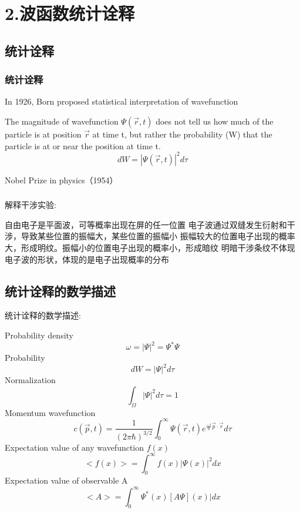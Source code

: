 \begin{frame}
\begin{columns}
\begin{column}[t]{0.46\linewidth}
\begin{center}
                \end{center} 
            \end{column}
        \end{columns}
\end{frame}

\section{2.波函数统计诠释}

\subsection{统计诠释}
\begin{frame}
    \frametitle{统计诠释}
    In 1926, Born proposed statistical interpretation of wavefunction
    \begin{tcolorbox4}
        \large The magnitude of wavefunction $\Psi(\vec{r},t)$ does not tell us how much of 
        the particle is at position $\vec{r}$ at time t, 
        but rather the probability (W) that the particle is at or near the position at time t. \\
        \[ d W = |\Psi(\vec{r},t)|^2 d \tau \]
    \end{tcolorbox4}
    {\color{deepred} Nobel Prize in physics（1954）}
\end{frame}

\begin{frame}
    \frametitle{}
    解释干涉实验:
    \begin{itemize}
        \Item 自由电子是平面波，可等概率出现在屏的任一位置
        \Item 电子波通过双缝发生衍射和干涉，导致某些位置的振幅大，某些位置的振幅小
        \Item 振幅较大的位置电子出现的概率大，形成明纹。振幅小的位置电子出现的概率小，形成暗纹
        \Item 明暗干涉条纹不体现电子波的形状，体现的是电子出现概率的分布
    \end{itemize}  
\end{frame}

\subsection{统计诠释的数学描述}

\begin{frame}[allowframebreaks=]
    统计诠释的数学描述:
    \begin{enumerate}
        \Item Probability density \[\omega = |\Psi|^2 =\Psi^* \Psi \]
        \Item Probability  \[ d W = |\Psi|^2 d \tau \]
        \Item Normalization \[ \int_{\Omega} |\Psi|^2 d \tau =1 \]
        \Item Momentum wavefunction \[ c(\vec{p},t)=\frac{1}{(2\pi\hbar)^{3/2}} \int_{0}^{\infty} \Psi(\vec{r},t) e^{\frac{-i}{\hbar} \vec{p}\cdot \vec{r} } d \tau \] 
        \Item Expectation value of any wavefunction $f (x)$  \[ <f(x)>=\int_{0}^{\infty} f(x) |\Psi(x)|^2 dx \]
        \Item Expectation value of observable A \[ <A>=\int_{0}^{\infty} \Psi^*(x) [A \Psi](x)| dx \]
    \end{enumerate}
\end{frame}

